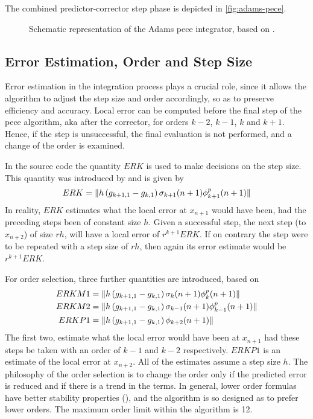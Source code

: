 The combined predictor-corrector step phase is depicted in \autoref{fig:adams-pece}.
\begin{figure}
  \centering
  
  \caption{Schematic representation of the Adams \gls{pece} integrator, based 
    on \cite{Shampine1975}.}
  \label{fig:adams-pece}
\end{figure}

\subsection{Error Estimation, Order and Step Size}\label{ssec:integrator-error-estimation}
Error estimation in the integration process plays a crucial role, since it allows 
the algorithm to adjust the step size and order accordingly, so as to preserve 
efficiency and accuracy. Local error can be computed before the final step of the 
\gls{pece} algorithm, aka after the corrector, for orders $k-2$, $k-1$, $k$ and 
$k+1$. Hence, if the step is unsuccessful, the final evaluation is not performed, 
and a change of the order is examined.

In the source code the quantity $ERK$ is used to make decisions on the step size. 
This quantity was introduced by \cite{Shampine1975} and is given by
\begin{equation}
  ERK = \lVert h \left( g_{k+1,1} - g_{k,1} \right) \sigma _{k+1}(n+1) \phi ^{p}_{k+1}(n+1)\rVert
\end{equation}
In reality, $ERK$ estimates what the local error at $x_{n+1}$ would have been, 
had the preceding steps been of constant size $h$. Given a successful step, the 
next step (to $x_{n+2}$) of size $rh$, will have a local error of $r^{k+1} ERK$. 
If on contrary the step were to be repeated with a step size of $rh$, then again 
its error estimate would be $r^{k+1} ERK$.

For order selection, three further quantities are introduced, based on \cite{Shampine1975}
\begin{align}
  ERKM1 &= \lVert h \left( g_{k+1,1} - g_{k,1} \right) \sigma _{k}(n+1) \phi ^{p}_{k}(n+1)\rVert \\
  ERKM2 &= \lVert h \left( g_{k+1,1} - g_{k,1} \right) \sigma _{k-1}(n+1) \phi ^{p}_{k-1}(n+1)\rVert\\
  ERKP1 &= \lVert h \left( g_{k+1,1} - g_{k,1} \right) \phi _{k+2}(n+1)\rVert
\end{align}
The first two, estimate what the local error would have been at $x_{n+1}$ had these 
steps be taken with an order of $k-1$ and $k-2$ respectively. $ERKP1$ is an estimate 
of the local error at $x_{n+2}$. All of the estimates assume a step size $h$. 
The philosophy of the order selection is to change the order only if the predicted 
error is reduced and if there is a trend in the terms. In general, lower order 
formulas have better stability properties (\cite{Shampine1975}), and the algorithm 
is so designed as to prefer lower orders. The maximum order limit within the 
algorithm is 12.

